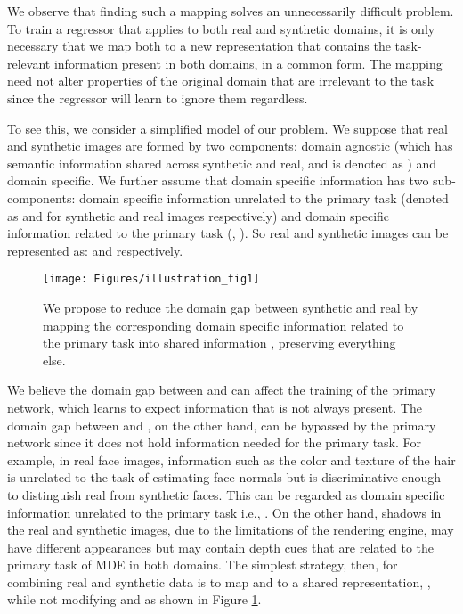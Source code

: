 \documentclass[10pt,twocolumn,letterpaper]{article}
\begin{document}
We observe that finding such a mapping solves an unnecessarily difficult problem.  To train a regressor that applies to both real and synthetic domains, it is only necessary that we map both to a new representation that contains the task-relevant information present in both domains, in a common form.
The mapping need not alter properties of the original domain that are irrelevant to the task since the regressor will learn to ignore them regardless. 


To see this, we consider a simplified model of our problem. We suppose that real and synthetic images are formed by two components: domain agnostic (which has semantic information shared across synthetic and real, and is denoted as ) and domain specific.
We further assume that domain specific information has two sub-components: domain specific information unrelated to the primary task (denoted as  and  for synthetic and real images respectively) and domain specific information related to the primary task (, ).
So real and synthetic images can be represented as:  and  respectively.

\begin{figure}
\centering
\texttt{[image: Figures/illustration\_fig1]}
    \caption{We propose to reduce the domain gap between synthetic and real by mapping the corresponding domain specific information related to the primary task  into shared information , preserving everything else. }
\label{fig:SharinGAN-intro1}
\end{figure}

We believe the domain gap between  and  can affect the training of the primary network, which learns to expect information that is not always present.
The domain gap between  and , on the other hand, can be bypassed by the primary network since it does not hold information needed for the primary task.
For example, in real face images, information such as the color and texture of the hair is unrelated to the task of estimating face normals but is discriminative enough to distinguish real from synthetic faces. This can be regarded as domain specific information unrelated to the primary task i.e., .
On the other hand, shadows in the real and synthetic images, due to the limitations of the rendering engine, may have different appearances but may contain depth cues that are related to the primary task of MDE in both domains.
The simplest strategy, then, for combining real and synthetic data is to map  and  to a shared representation, , while not modifying  and  as shown in Figure \ref{fig:SharinGAN-intro1}.
\end{document}
